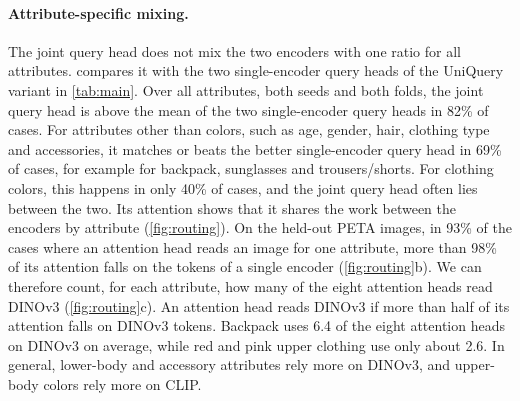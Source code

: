 \documentclass[10pt,twocolumn,letterpaper]{article}
\begin{document}
\paragraph{Attribute-specific mixing.} The joint query head does not mix the two encoders with one ratio for all attributes.  compares it with the two single-encoder query heads of the UniQuery variant in \cref{tab:main}. Over all attributes, both seeds and both folds, the joint query head is above the mean of the two single-encoder query heads in 82\% of cases. For attributes other than colors, such as age, gender, hair, clothing type and accessories, it matches or beats the better single-encoder query head in 69\% of cases, for example for backpack, sunglasses and trousers/shorts. For clothing colors, this happens in only 40\% of cases, and the joint query head often lies between the two. Its attention shows that it shares the work between the encoders by attribute (\cref{fig:routing}). On the held-out PETA images, in 93\% of the cases where an attention head reads an image for one attribute, more than 98\% of its attention falls on the tokens of a single encoder (\cref{fig:routing}b). We can therefore count, for each attribute, how many of the eight attention heads read DINOv3 (\cref{fig:routing}c). An attention head reads DINOv3 if more than half of its attention falls on DINOv3 tokens. Backpack uses 6.4 of the eight attention heads on DINOv3 on average, while red and pink upper clothing use only about 2.6. In general, lower-body and accessory attributes rely more on DINOv3, and upper-body colors rely more on CLIP.
\end{document}
